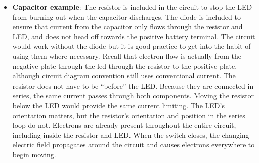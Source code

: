 \documentclass{report}
\begin{document}
\begin{itemize}
            \bigbreak \noindent 
            A Charged Particle creates an electric field around itself. If you bring another charge near it, the field will either push it away or pull it in.
            \bigbreak \noindent 
            In a capacitor, you have a plate covered in positive charges directly facing a plate covered in negative charges.
            \bigbreak \noindent 
            Because they are trapped on separate plates, they cannot touch, but they still pull on each other.
            \bigbreak \noindent 
            This intense pull across the empty gap creates a concentrated electric field.That field holds energy in place, like a stretched rubber band, until you give the charges a path to flow.
            \bigbreak \noindent 
            Because they are pulling hard but cannot move, they build up \textbf{potential energy}.
            \bigbreak \noindent 
            The moment you connect the capacitor to a circuit (like a wire leading to a lightbulb), you provide a "detour."
            \bigbreak \noindent 
            The electrons on the negative plate realize they can take the wire route to get to the positive plate.They rush through the wire to meet the positive charges.
        \item \textbf{Capacitor example}: 
            \bigbreak \noindent 
            \bigbreak \noindent 
            The resistor is included in the circuit to stop the LED from burning out when the capacitor discharges. The diode is included to ensure that current from the capacitor only flows through the resistor and LED, and does not head off towards the positive battery terminal. The circuit would work without the diode but it is good practice to get into the habit of using them where necessary.
            \bigbreak \noindent 
            Recall that electron flow is actually from the negative plate through the led through the resistor to the positive plate, although circuit diagram convention still uses conventional current.
            \bigbreak \noindent 
            The resistor does not have to be “before” the LED. Because they are connected in series, the same current passes through both components. Moving the resistor below the LED would provide the same current limiting. The LED’s orientation matters, but the resistor’s orientation and position in the series loop do not.
            \bigbreak \noindent 
            Electrons are already present throughout the entire circuit, including inside the resistor and LED. When the switch closes, the changing electric field propagates around the circuit and causes electrons everywhere to begin moving.

\end{itemize}
\end{document}

